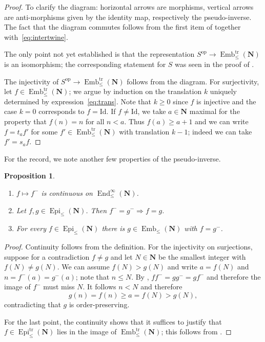 \documentclass[12pt, pdflatex]{amsart}
\newtheorem{proposition}[theorem]{Proposition}
\theoremstyle{definition}
\numberwithin{equation}{section}
\numberwithin{theorem}{section}
\newcommand{\NN}{\mathbf{N}}
\DeclareMathOperator{\End}{End}
\DeclareMathOperator{\Emb}{Emb}
\DeclareMathOperator{\Epi}{Epi}
\begin{document}
\begin{proof}
To clarify the diagram: horizontal arrows are morphisms, vertical arrows are anti-morphisms given by the identity map, respectively the pseudo-inverse. The fact that the diagram commutes follows from the first item of  together with~\eqref{eq:intertwine}.

The only point not yet established is that the representation $S^\mathrm{op}\to \Emb_\leq^\mathrm{tr}(\NN)$ is an isomorphism; the corresponding statement for $S$ was seen in the proof of .

The injectivity of $S^\mathrm{op}\to \Emb_\leq^\mathrm{tr}(\NN)$ follows from the diagram. For surjectivity, let $f\in \Emb_\leq^\mathrm{tr}(\NN)$; we argue by induction on the translation $k$ uniquely determined by expression~\eqref{eq:trans}. Note that $k\geq 0$ since $f$ is injective and the case $k=0$ corresponds to $f=\mathrm{Id}$. If $f\neq \mathrm{Id}$, we take $a\in\NN$ maximal for the property that $f(n)=n$ for all $n<a$. Thus $f(a)\geq a+1$ and we can write $f = t_a f'$ for some $f'\in \Emb_\leq^\mathrm{tr}(\NN)$ with translation $k-1$; indeed we can take $f'=s_a f$.
\end{proof}

For the record, we note another few properties of the pseudo-inverse.

\begin{proposition}\label{prop:inj-surj}
\ 
\begin{enumerate}
\item $f\mapsto f^-$ is continuous on $\End_\leq^\infty(\NN)$.
\item Let $f, g\in \Epi_\leq(\NN)$. Then $f^- = g^- \Longrightarrow f=g$.
\item For every $f\in \Epi_\leq(\NN)$ there is $g\in \Emb_\leq(\NN)$ with $f=g^-$.
\end{enumerate}
\end{proposition}

\begin{proof}
Continuity follows from the definition. For the injectivity on surjections, suppose for a contradiction $f\neq g$ and let $N\in \NN$ be the smallest integer with $f(N)\neq g(N)$. We can assume $f(N)>g(N)$ and write $a=f(N)$ and $n=f^-(a)=g^-(a)$; note that $n\leq N$. By , $f f^- = g g^- = g f^-$ and therefore the image of $f^-$ must miss $N$. It follows $n<N$ and therefore
\begin{equation*}
g(n) = f(n) \geq a = f(N) > g(N),
\end{equation*}
contradicting that $g$ is order-preserving.

For the last point, the continuity shows that it suffices to justify that $f\in \Epi_\leq^\mathrm{tr}(\NN)$ lies in the image of $\Emb_\leq^\mathrm{tr}(\NN)$; this follows from .
\end{proof}
\end{document}
